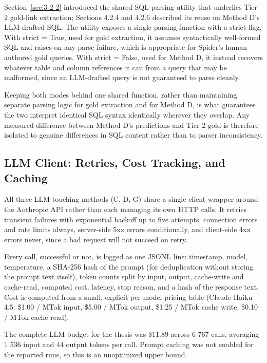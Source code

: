 Section~\ref{sec:3-2-2} introduced the shared SQL-parsing utility that underlies Tier 2 gold-link extraction; Sections 4.2.4 and 4.2.6 described its reuse on Method D's LLM-drafted SQL. The utility exposes a single parsing function with a strict flag. With strict = True, used for gold extraction, it assumes syntactically well-formed SQL and raises on any parse failure, which is appropriate for Spider's human-authored gold queries. With strict = False, used for Method D, it instead recovers whatever table and column references it can from a query that may be malformed, since an LLM-drafted query is not guaranteed to parse cleanly.

Keeping both modes behind one shared function, rather than maintaining separate parsing logic for gold extraction and for Method D, is what guarantees the two interpret identical SQL syntax identically wherever they overlap. Any measured difference between Method D's predictions and Tier 2 gold is therefore isolated to genuine differences in SQL content rather than to parser inconsistency.

\subsection{LLM Client: Retries, Cost Tracking, and Caching}\label{sec:4-3-3}

All three LLM-touching methods (C, D, G) share a single client wrapper around the Anthropic API rather than each managing its own HTTP calls. It retries transient failures with exponential backoff up to five attempts: connection errors and rate limits always, server-side 5xx errors conditionally, and client-side 4xx errors never, since a bad request will not succeed on retry.

Every call, successful or not, is logged as one JSONL line: timestamp, model, temperature, a SHA-256 hash of the prompt (for deduplication without storing the prompt text itself), token counts split by input, output, cache-write and cache-read, computed cost, latency, stop reason, and a hash of the response text. Cost is computed from a small, explicit per-model pricing table (Claude Haiku 4.5: \$1.00 / MTok input, \$5.00 / MTok output, \$1.25 / MTok cache write, \$0.10 / MTok cache read).

The complete LLM budget for the thesis was \$11.89 across 6 767 calls, averaging 1 536 input and 44 output tokens per call. Prompt caching was not enabled for the reported runs, so this is an unoptimized upper bound.

